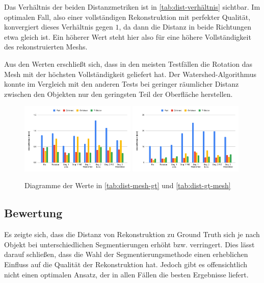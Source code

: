 Das Verhältnis der beiden Distanzmetriken ist in \autoref{tab:dist-verhältnis} sichtbar.
Im optimalen Fall, also einer vollständigen Rekonstruktion mit perfekter Qualität, konvergiert dieses Verhältnis gegen $1$, da dann die Distanz in beide Richtungen etwa gleich ist.
Ein höherer Wert steht hier also für eine höhere Vollständigkeit des rekonstruierten Meshs.

Aus den Werten erschließt sich, dass in den meisten Testfällen die Rotation das Mesh mit der höchsten Vollständigkeit geliefert hat.
Der Watershed-Algorithmus konnte im Vergleich mit den anderen Tests bei geringer räumlicher Distanz zwischen den Objekten nur den geringsten Teil der Oberfläche herstellen.

\begin{figure}[H]
	\centering
	\includegraphics[width=0.49\textwidth]{images/segmentation/meanDistance1.png}
	\includegraphics[width=0.49\textwidth]{images/segmentation/meanDistance2.png}
	\caption{Diagramme der Werte in \autoref{tab:dist-mesh-gt} und \autoref{tab:dist-gt-mesh}}
\end{figure}


\subsection{Bewertung}
\label{subsec:auswertung-daten-bewertung}

Es zeigte sich, dass die Distanz von Rekonstruktion zu Ground Truth sich je nach Objekt bei unterschiedlichen Segmentierungen erhöht bzw. verringert.
Dies lässt darauf schließen, dass die Wahl der Segmentierungsmethode einen erheblichen Einfluss auf die Qualität der Rekonstruktion hat.
Jedoch gibt es offensichtlich nicht einen optimalen Ansatz, der in allen Fällen die besten Ergebnisse liefert.

